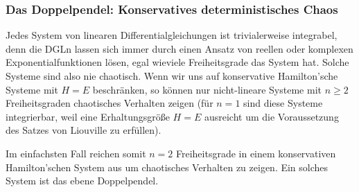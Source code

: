 \documentclass[10pt, letterpaper]{article}
\begin{document}
\subsubsection*{Das Doppelpendel: Konservatives deterministisches Chaos}

Jedes System von linearen Differentialgleichungen ist trivialerweise integrabel, denn die DGLn lassen sich immer durch einen Ansatz von reellen oder komplexen Exponentialfunktionen lösen, egal wieviele Freiheitsgrade das System hat. Solche Systeme sind also nie chaotisch. Wenn wir uns auf konservative Hamilton'sche Systeme mit $H=E$ beschränken, so können nur nicht-lineare Systeme mit $n\geq 2$ Freiheitsgraden chaotisches Verhalten zeigen (für $n=1$ sind diese Systeme integrierbar, weil eine Erhaltungsgröße $H=E$ ausreicht um die Voraussetzung des Satzes von Liouville zu erfüllen).

Im einfachsten Fall reichen somit $n=2$ Freiheitsgrade in einem konservativen Hamilton'schen System aus um chaotisches Verhalten zu zeigen. Ein solches System ist das ebene Doppelpendel.

\begin{center}
\end{center}
\end{document}
